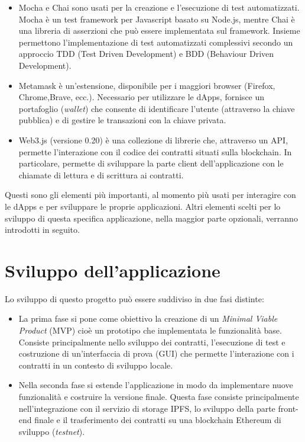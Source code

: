 \begin{itemize}
\item Mocha e Chai sono usati per la creazione e l'esecuzione di test automatizzati. Mocha è un test framework per Javascript basato su Node.js, mentre Chai è una libreria di asserzioni che può essere implementata sul framework. Insieme permettono l'implementazione di test automatizzati complessivi secondo un approccio TDD (Test Driven Development) e BDD (Behaviour Driven Development).

\item Metamask è un’estensione, disponibile per i maggiori browser (Firefox, Chrome,Brave, ecc.). Necessario per utilizzare le dApps, fornisce un portafoglio (\emph{wallet}) che consente di identificare l'utente (attraverso la chiave pubblica) e di gestire le transazioni con la chiave privata.

\item Web3.js (versione 0.20) è una collezione di librerie che, attraverso un API, permette l'interazione con il codice dei contratti situati sulla blockchain. In particolare, permette di sviluppare la parte client dell'applicazione con le chiamate di lettura e di scrittura ai contratti.

\end{itemize}

Questi sono gli elementi più importanti, al momento più usati per interagire con le dApps e per sviluppare le proprie applicazioni. Altri elementi scelti per lo sviluppo di questa specifica applicazione, nella maggior parte opzionali, verranno introdotti in seguito.

\section{Sviluppo dell'applicazione}

Lo sviluppo di questo progetto può essere suddiviso in due fasi distinte:

\begin{itemize}

\item La prima fase si pone come obiettivo la creazione di un \emph{Minimal Viable Product} (MVP) cioè un prototipo che implementata le funzionalità base. Consiste principalmente nello sviluppo dei contratti, l'esecuzione di test e costruzione di un'interfaccia di prova (GUI) che permette l'interazione con i contratti in un contesto di sviluppo locale.

\item Nella seconda fase si estende l'applicazione in modo da implementare nuove funzionalità e costruire la versione finale. Questa fase consiste principalmente nell'integrazione con il servizio di storage IPFS, lo sviluppo della parte front-end finale e il trasferimento dei contratti su una blockchain Ethereum di sviluppo (\emph{testnet}).

\end{itemize}

